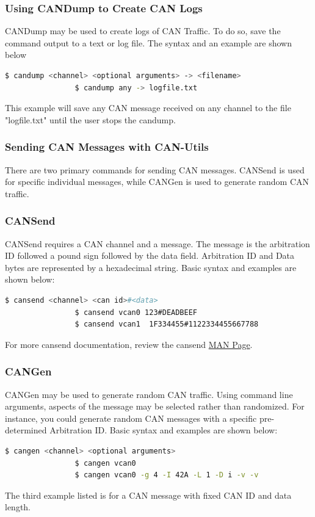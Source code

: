         \subsubsection{Using CANDump to Create CAN Logs}
            CANDump may be used to create logs of CAN Traffic. To do so, save the command output to a text or log file. The syntax and an example are shown below
            \begin{lstlisting}[language=bash, autogobble=true]
                $ candump <channel> <optional arguments> -> <filename>
                $ candump any -> logfile.txt
            \end{lstlisting}
            This example will save any CAN message received on any channel to the file "logfile.txt" until the user stops the candump.
            
        \subsubsection{Sending CAN Messages with CAN-Utils}
            There are two primary commands for sending CAN messages. CANSend is used for specific individual messages, while CANGen is used to generate random CAN traffic.
        \subsubsection{CANSend}
            CANSend requires a CAN channel and a message. The message is the arbitration ID followed a pound sign followed by the data field. Arbitration ID and Data bytes are represented by a hexadecimal string. Basic syntax and examples are shown below:
            \begin{lstlisting}[language=bash, autogobble=true]
                $ cansend <channel> <can id>#<data>
                $ cansend vcan0 123#DEADBEEF
                $ cansend vcan1  1F334455#1122334455667788
            \end{lstlisting}
             For more cansend documentation, review the cansend \href{https://manpages.debian.org/testing/can-utils/cansend.1.en.html}{MAN Page}.
        \subsubsection{CANGen}
            CANGen may be used to generate random CAN traffic. Using command line arguments, aspects of the message may be selected rather than randomized. For instance, you could generate random CAN messages with a specific pre-determined Arbitration ID. Basic syntax and examples are shown below:
            \begin{lstlisting}[language=bash, autogobble=true]
                $ cangen <channel> <optional arguments>
                $ cangen vcan0
                $ cangen vcan0 -g 4 -I 42A -L 1 -D i -v -v 
            \end{lstlisting}
            The third example listed is for a CAN message with fixed CAN ID and data length. 
            
